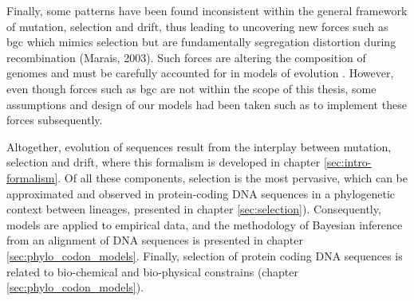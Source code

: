 Finally, some patterns have been found inconsistent within the general framework of mutation, selection and drift, thus leading to uncovering new forces such as \gls{bgc} which mimics selection but are fundamentally segregation distortion during recombination (Marais, 2003).
Such forces are altering the composition of genomes and must be carefully accounted for in models of evolution \citep{Galtier2009, Figuet2014}.
However, even though forces such as \gls{bgc} are not within the scope of this thesis, some assumptions and design of our models had been taken such as to implement these forces subsequently. 

Altogether, evolution of sequences result from the interplay between mutation, selection and drift, where this formalism is developed in chapter \ref{sec:intro-formalism}.
Of all these components, selection is the most pervasive, which can be approximated and observed in protein-coding \acrshort{DNA} sequences in a phylogenetic context between lineages, presented in chapter \ref{sec:selection}).
Consequently, models are applied to empirical data, and the methodology of Bayesian inference from an alignment of DNA sequences is presented in chapter \ref{sec:phylo_codon_models}.
Finally, selection of protein coding DNA sequences is related to bio-chemical and bio-physical constrains (chapter \ref{sec:phylo_codon_models}).
